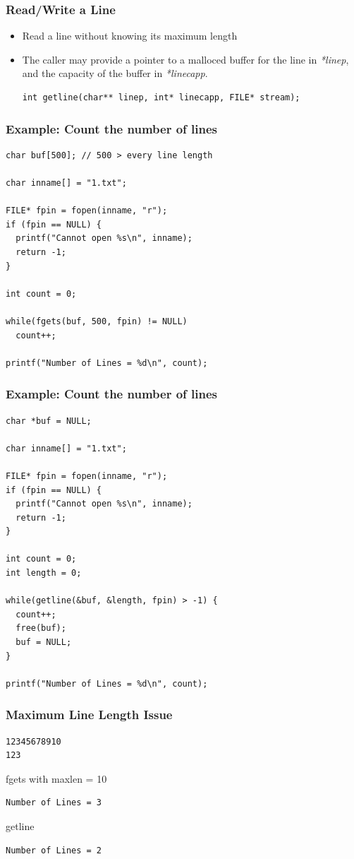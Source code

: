 \documentclass{../c-lecture}
\begin{document}
\begin{frame}[fragile]
  \frametitle{Read/Write a Line}
  \begin{itemize}
    \item Read a line without knowing its maximum length
    \item
      The caller may provide a pointer to a malloced buffer for the line in
      \textit{\color{YellowOrange}*linep}, and the capacity of the buffer in
      \textit{\color{LimeGreen}*linecapp}.

    \begin{verbatim}
int getline(char** linep, int* linecapp, FILE* stream);
    \end{verbatim}
  \end{itemize}
\end{frame}

\begin{frame}[fragile]
  \frametitle{Example: Count the number of lines}
  \scriptsize
  \begin{verbatim}
char buf[500]; // 500 > every line length

char inname[] = "1.txt";

FILE* fpin = fopen(inname, "r");
if (fpin == NULL) {
  printf("Cannot open %s\n", inname);
  return -1;
}

int count = 0;

while(fgets(buf, 500, fpin) != NULL)
  count++;

printf("Number of Lines = %d\n", count);
  \end{verbatim}
\end{frame}

\begin{frame}[fragile]
  \frametitle{Example: Count the number of lines}
  \scriptsize
  \begin{verbatim}
char *buf = NULL;

char inname[] = "1.txt";

FILE* fpin = fopen(inname, "r");
if (fpin == NULL) {
  printf("Cannot open %s\n", inname);
  return -1;
}

int count = 0;
int length = 0;

while(getline(&buf, &length, fpin) > -1) {
  count++;
  free(buf);
  buf = NULL;
}

printf("Number of Lines = %d\n", count);
  \end{verbatim}
\end{frame}

\begin{frame}[fragile]
  \frametitle{Maximum Line Length Issue}
  \begin{verbatim}
12345678910
123
  \end{verbatim}
  fgets with maxlen = 10
  \begin{verbatim}
Number of Lines = 3
  \end{verbatim}
  getline
  \begin{verbatim}
Number of Lines = 2
  \end{verbatim}
\end{frame}
\end{document}
